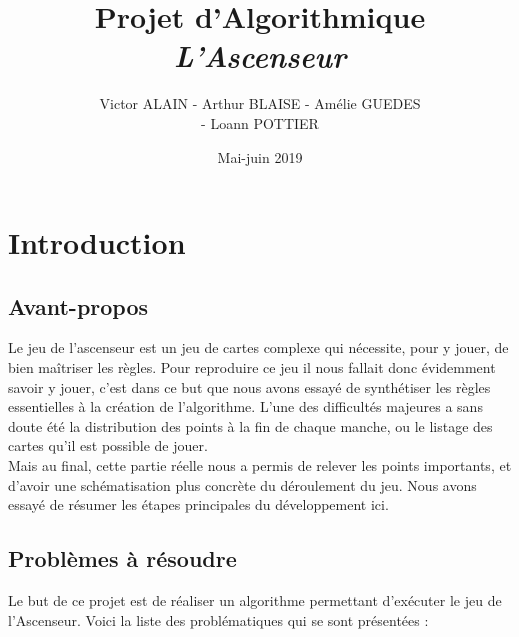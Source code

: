 \documentclass[12pt]{report}
\title{Projet d'Algorithmique \\ \textit{L'Ascenseur} }
\date{Mai-juin 2019}
\author{Victor \textsc{ALAIN} - Arthur \textsc{BLAISE} - Amélie \textsc{GUEDES} \\ - Loann \textsc{POTTIER}}
\renewcommand{\thesection}{\Roman{section}}
\begin{document}
\renewcommand{\thesection}{\textbf{\Roman{section}}} %

\maketitle
\tableofcontents

\clearpage


\section{Introduction}

\subsection{Avant-propos}
	Le jeu de l'ascenseur est un jeu de cartes complexe qui nécessite, pour y jouer, de bien maîtriser les règles. Pour reproduire ce jeu il nous fallait donc évidemment savoir y jouer, c'est dans ce but que nous avons essayé de synthétiser les règles essentielles à la création de l'algorithme. L'une des difficultés majeures a sans doute été la distribution des points à la fin de chaque manche, ou le listage des cartes qu'il est possible de jouer.\\
	
	Mais au final, cette partie réelle nous a permis de relever les points importants, et d'avoir une schématisation plus concrète du déroulement du jeu. Nous avons essayé de résumer les étapes principales du développement ici.

	
\subsection{Problèmes à résoudre}
	
	Le but de ce projet est de réaliser un algorithme permettant d'exécuter le jeu de l'Ascenseur. Voici la liste des problématiques qui se sont présentées :\\
	
\end{document}

